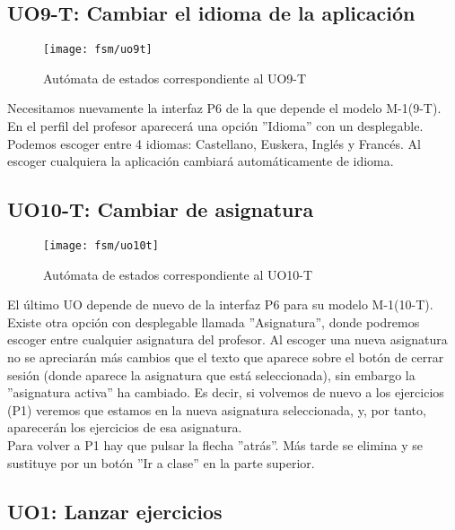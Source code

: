 \subsection{UO9-T: Cambiar el idioma de la aplicación}
\label{analisis-de-requisitos:funcionales:uo9t}

\begin{figure}[H]
	\centering
	\texttt{[image: fsm/uo9t]}
	\caption{Autómata de estados correspondiente al UO9-T}
	\label{fig:analisis-de-requisitos:funcionales:uo9t:fsm}
\end{figure}

Necesitamos nuevamente la interfaz P6 de la que depende el modelo M-1(9-T). En el perfil del profesor aparecerá una opción ''Idioma'' con un desplegable. Podemos escoger entre 4 idiomas: Castellano, Euskera, Inglés y Francés. Al escoger cualquiera la aplicación cambiará automáticamente de idioma.\\

\subsection{UO10-T: Cambiar de asignatura}
\label{analisis-de-requisitos:funcionales:uo10t}

\begin{figure}[H]
	\centering
	\texttt{[image: fsm/uo10t]}
	\caption{Autómata de estados correspondiente al UO10-T}
	\label{fig:analisis-de-requisitos:funcionales:uo10t:fsm}
\end{figure}

El último UO depende de nuevo de la interfaz P6 para su modelo M-1(10-T). Existe otra opción con desplegable llamada ''Asignatura'', donde podremos escoger entre cualquier asignatura del profesor. Al escoger una nueva asignatura no se apreciarán más cambios que el texto que aparece sobre el botón de cerrar sesión (donde aparece la asignatura que está seleccionada), sin embargo la ''asignatura activa'' ha cambiado. Es decir, si volvemos de nuevo a los ejercicios (P1) veremos que estamos en la nueva asignatura seleccionada, y, por tanto, aparecerán los ejercicios de esa asignatura.\\

Para volver a P1 hay que pulsar la flecha ''atrás''. Más tarde se elimina y se sustituye por un botón ''Ir a clase'' en la parte superior.\\

\subsection{UO1: Lanzar ejercicios}
\label{analisis-de-requisitos:funcionales:uo1}

